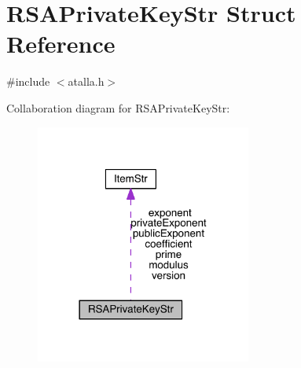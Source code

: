 \hypertarget{struct_r_s_a_private_key_str}{}\section{R\+S\+A\+Private\+Key\+Str Struct Reference}
\label{struct_r_s_a_private_key_str}


{\ttfamily \#include $<$atalla.\+h$>$}



Collaboration diagram for R\+S\+A\+Private\+Key\+Str\+:\nopagebreak
\begin{figure}[H]
\begin{center}
\leavevmode
\includegraphics[width=201pt]{struct_r_s_a_private_key_str__coll__graph}
\end{center}
\end{figure}
